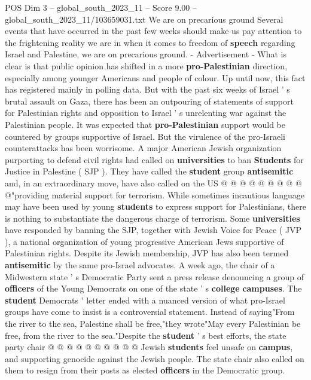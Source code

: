 \begin{textsample}{POS Dim 3 – global\_south\_2023\_11 – Score 9.00 – global\_south\_2023\_11/103659031.txt}  \label{ex:f3_pos_356}
We are on precarious ground Several events that have occurred in the past few weeks should make us pay attention to the frightening reality we are in when it comes to freedom of \textbf{speech} regarding Israel and Palestine, we are on precarious ground. - Advertisement - What is clear is that public opinion has shifted in a more \textbf{pro-Palestinian} direction, especially among younger Americans and people of colour.
Up until now, this fact has registered mainly in polling data.
But with the past six weeks of Israel ' s brutal assault on Gaza, there has been an outpouring of statements of support for Palestinian rights and opposition to Israel ' s unrelenting war against the Palestinian people.
It was expected that \textbf{pro-Palestinian} support would be countered by groups supportive of Israel.
But the virulence of the pro-Israeli counterattacks has been worrisome.
A major American Jewish organization purporting to defend civil rights had called on \textbf{universities} to ban \textbf{Students} for Justice in Palestine ( SJP ).
They have called the \textbf{student} group \textbf{antisemitic} and, in an extraordinary move, have also called on the US @ @ @ @ @ @ @ @ @ @"providing material support for terrorism.
While sometimes incautious language may have been used by young \textbf{students} to express support for Palestinians, there is nothing to substantiate the dangerous charge of terrorism.
Some \textbf{universities} have responded by banning the SJP, together with Jewish Voice for Peace ( JVP ), a national organization of young progressive American Jews supportive of Palestinian rights.
Despite its Jewish membership, JVP has also been termed \textbf{antisemitic} by the same pro-Israel advocates.
A week ago, the chair of a Midwestern state ' s Democratic Party sent a press release denouncing a group of \textbf{officers} of the Young Democrats on one of the state ' s \textbf{college} \textbf{campuses}.
The \textbf{student} Democrats ' letter ended with a nuanced version of what pro-Israel groups have come to insist is a controversial statement.
Instead of saying"From the river to the sea, Palestine shall be free,"they wrote"May every Palestinian be free, from the river to the sea."Despite the \textbf{student} ' s best efforts, the state party chair @ @ @ @ @ @ @ @ @ @ Jewish \textbf{students} feel unsafe on \textbf{campus}, and supporting genocide against the Jewish people.
The state chair also called on them to resign from their posts as elected \textbf{officers} in the Democratic group.

\end{textsample}
